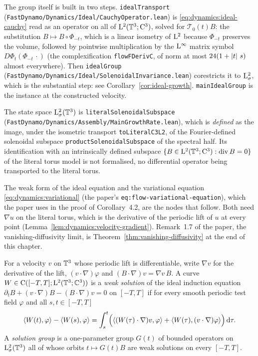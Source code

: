 The group itself is built in two steps.  \texttt{idealTransport}
(\texttt{FastDynamo/Dynamics/Ideal/CauchyOperator.lean}) is
\eqref{eq:dynamics:ideal-cauchy} read as an operator on all of $\mathrm{L}^2(\mathbb{T}^3;\mathrm{C}^3)$, solved for
$\mathcal T_0(t)B$: the substitution $B\mapsto B\circ\Phi_{-t}$, which is a linear isometry of
$\mathrm{L}^2$ because $\Phi_{-t}$ preserves the volume, followed by pointwise multiplication by the
$\mathrm{L}^\infty$ matrix symbol $D\Phi_t(\Phi_{-t}\,\cdot)$ (the complexification
\texttt{flowFDerivC}, of norm at most $24(1+\left\lvert t\right\rvert\,s)$ almost everywhere).  Then
\texttt{idealGroup} (\texttt{FastDynamo/Dynamics/Ideal/SolenoidalInvariance.lean})
corestricts it to $\mathrm{L}^2_\sigma$, which is the substantial step: see
Corollary~\ref{cor:ideal-growth}.  \texttt{mainIdealGroup} is the instance at the constructed
velocity.

The state space $\mathrm{L}^2_\sigma(\mathbb{T}^3) $ is \texttt{literalSolenoidalSubspace}
(\texttt{FastDynamo/Dynamics/Assembly/MainGrowthRate.lean}), which is \emph{defined} as the
image, under the isometric transport \texttt{toLiteralC3L2}, of the Fourier-defined solenoidal
subspace \texttt{productSolenoidalSubspace} of the spectral half.  Its identification with an
intrinsically defined subspace $\{B\in\mathrm{L}^2(\mathbb{T}^3;\mathrm{C}^3):\operatorname{div} B=0\} $ of the literal torus
model is not formalised, no differential operator being transported to the literal torus.

The weak form of the ideal equation and the variational equation
\eqref{eq:dynamics:variational} (the paper's \texttt{eq:flow-variational-equation}), which the
paper uses in the proof of Corollary~4.2, are the nodes that follow.  Both need $\nabla u$ on
the literal torus, which is the derivative of the periodic lift of $u$ at every point
(Lemma~\ref{lem:dynamics:velocity-gradient}).  Remark~1.7 of the paper, the
vanishing-diffusivity limit, is Theorem~\ref{thm:vanishing-diffusivity} at the end of this
chapter.

\begin{definition}
  \label{def:dynamics:ideal-weak-form}
  \leanok
  For a velocity $v$ on $\mathbb{T}^3$ whose periodic lift is differentiable, write $\nabla v$ for the
  derivative of the lift, $(v\cdot\nabla)\varphi$ and $(B\cdot\nabla)v=\nabla v\,B$.  A curve
  $W\in\mathrm{C}([-T,T];\mathrm{L}^2(\mathbb{T}^3;\mathbb{C}^3))$ is a \emph{weak solution} of the ideal induction
  equation $\partial_tB+(v\cdot\nabla)B-(B\cdot\nabla)v=0$ on $[-T,T]$ if for every smooth
  periodic test field $\varphi$ and all $s,t\in[-T,T]$
  \[
    \left\langle W(t),\varphi\right\rangle-\left\langle W(s),\varphi\right\rangle
    =\int_s^t\Bigl(\left\langle(W(\tau)\cdot\nabla)v,\varphi\right\rangle
      +\left\langle W(\tau),(v\cdot\nabla)\varphi\right\rangle\Bigr)\,\mathrm{d}\tau .
  \]
  A \emph{solution group} is a one-parameter group $G(t)$ of bounded operators on
  $\mathrm{L}^2_\sigma(\mathbb{T}^3)$ all of whose orbits $t\mapsto G(t)B$ are weak solutions on every
  $[-T,T]$.
\end{definition}

